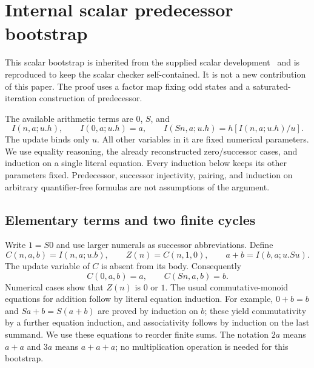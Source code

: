 \documentclass[11pt,a4paper]{article}
\theoremstyle{definition}\newtheorem{definition}[theorem]{Definition}
\begin{document}


\section{Internal scalar predecessor bootstrap}
\label{sec:hybrid-bootstrap}

This scalar bootstrap is inherited from the supplied scalar development~\cite{erasure} and is reproduced to keep the scalar checker self-contained. It is not a new contribution of this paper. The proof uses a factor map fixing odd states and a saturated-iteration construction of predecessor.

The available arithmetic terms are $0$, $S$, and
\[
 I(n,a;u.h),\qquad
 I(0,a;u.h)=a,\qquad
 I(Sn,a;u.h)=h[I(n,a;u.h)/u].
\]
The update binds only $u$.  All other variables in it are fixed numerical
parameters.  We use equality reasoning, the already reconstructed
zero/successor cases, and induction on a single literal equation.
Every induction below keeps its other parameters fixed.  Predecessor,
successor injectivity, pairing, and induction on arbitrary
quantifier-free formulas are not assumptions of the argument.

\subsection{Elementary terms and two finite cycles}

Write $1=S0$ and use larger numerals as successor abbreviations.  Define
\[
 C(n,a,b)=I(n,a;u.b),\qquad
 Z(n)=C(n,1,0),\qquad
 a+b=I(b,a;u.Su).
\]
The update variable of $C$ is absent from its body.  Consequently
\[
 C(0,a,b)=a,\qquad C(Sn,a,b)=b.
\]
Numerical cases show that $Z(n)$ is $0$ or $1$.
The usual commutative-monoid equations for addition follow by literal
equation induction.  For example, $0+b=b$ and $Sa+b=S(a+b)$ are
proved by induction on $b$; these yield commutativity by a further
equation induction, and associativity follows by induction on the last
summand.  We use these equations to reorder finite sums.  The notation
$2a$ means $a+a$ and $3a$ means $a+a+a$; no multiplication operation
is needed for this bootstrap.
\end{document}
